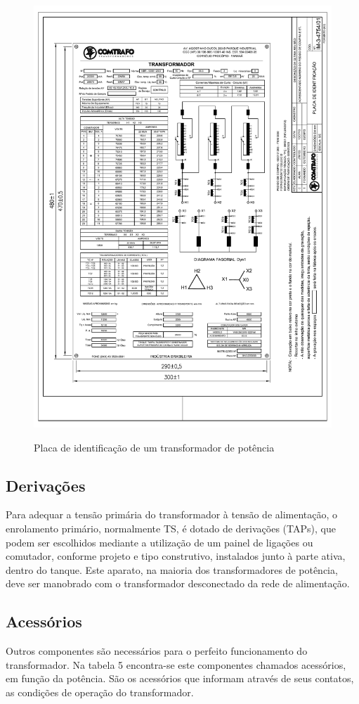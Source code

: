 \documentclass[a5paper]{ufsc-thesis}
\begin{document}
\begin{figure}[htb]
  \caption{Placa de identificação de um transformador de potência}
  \centering
  \includegraphics[width=12cm]{placatrafo.pdf}
  \label{fig:placatrafo}
\end{figure}


\subsection{Derivações}
Para adequar a tensão primária do transformador à tensão de alimentação, o enrolamento primário, normalmente TS, é dotado de derivações (TAPs), que podem ser escolhidos mediante a utilização de um painel de ligações ou comutador, conforme projeto e tipo construtivo, instalados junto à parte ativa, dentro do tanque. Este aparato, na maioria dos transformadores de potência, deve ser manobrado com o transformador desconectado da rede de alimentação.

\subsection{Acessórios}
Outros componentes são necessários para o perfeito funcionamento do
transformador. Na tabela 5 encontra-se este componentes chamados acessórios, em
função da potência. São os acessórios que informam através de seus contatos, as
condições de operação do transformador.
\end{document}

